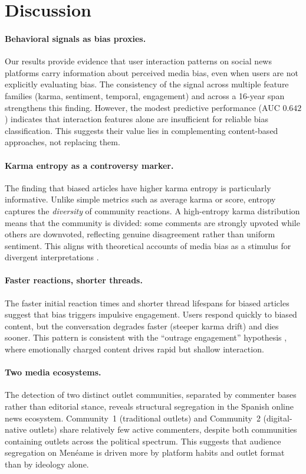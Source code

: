 \section{Discussion}
\label{sec:discussion}

\paragraph{Behavioral signals as bias proxies.}
Our results provide evidence that user interaction patterns on social news platforms carry information about perceived media bias, even when users are not explicitly evaluating bias.
The consistency of the signal across multiple feature families (karma, sentiment, temporal, engagement) and across a 16-year span strengthens this finding.
However, the modest predictive performance (AUC $0.642$) indicates that interaction features alone are insufficient for reliable bias classification.
This suggests their value lies in complementing content-based approaches, not replacing them.

\paragraph{Karma entropy as a controversy marker.}
The finding that biased articles have higher karma entropy is particularly informative.
Unlike simple metrics such as average karma or score, entropy captures the \textit{diversity} of community reactions.
A high-entropy karma distribution means that the community is divided: some comments are strongly upvoted while others are downvoted, reflecting genuine disagreement rather than uniform sentiment.
This aligns with theoretical accounts of media bias as a stimulus for divergent interpretations \cite{vallone1985hostile}.

\paragraph{Faster reactions, shorter threads.}
The faster initial reaction times and shorter thread lifespans for biased articles suggest that bias triggers impulsive engagement.
Users respond quickly to biased content, but the conversation degrades faster (steeper karma drift) and dies sooner.
This pattern is consistent with the ``outrage engagement'' hypothesis \cite{rathje2021out}, where emotionally charged content drives rapid but shallow interaction.

\paragraph{Two media ecosystems.}
The detection of two distinct outlet communities, separated by commenter bases rather than editorial stance, reveals structural segregation in the Spanish online news ecosystem.
Community~1 (traditional outlets) and Community~2 (digital-native outlets) share relatively few active commenters, despite both communities containing outlets across the political spectrum.
This suggests that audience segregation on Men\'eame is driven more by platform habits and outlet format than by ideology alone.

